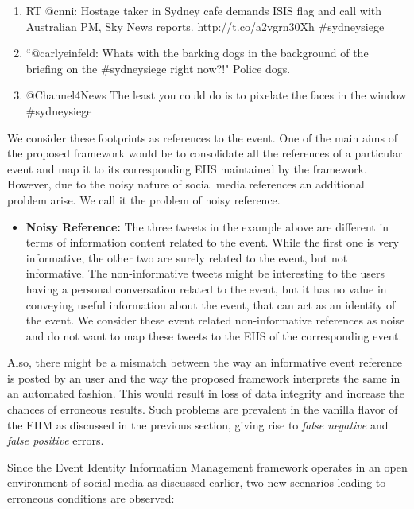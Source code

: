 \begin{enumerate}
\item RT @cnni: Hostage taker in Sydney cafe demands ISIS flag and call with Australian PM, Sky News reports. http://t.co/a2vgrn30Xh \#sydneysiege
\item ``@carlyeinfeld: Whats with the barking dogs in the background of the briefing on the \#sydneysiege right now?!" Police dogs.
\item @Channel4News The least you could do is to pixelate the faces in the window \#sydneysiege
\end{enumerate}

We consider these footprints as references to the event. One of the main aims of the proposed framework would be to consolidate all the references of a particular event and map it to its corresponding EIIS maintained by the framework. However, due to the noisy nature of social media references an additional problem arise. We call it the problem of noisy reference.

\begin{itemize}
\item \textbf{Noisy Reference:} The three tweets in the example above are different in terms of information content related to the event. While the first one is very informative, the other two are surely related to the event, but not informative. The non-informative tweets might be interesting to the users having a personal conversation related to the event, but it has no value in conveying useful information about the event, that can act as an identity of the event. We consider these event related non-informative references as noise and do not want to map these tweets to the EIIS of the corresponding event. 
\end{itemize}

Also, there might be a mismatch between the way an informative event reference is posted by an user and the way the proposed framework interprets the same in an automated fashion. This would result in loss of data integrity and increase the chances of erroneous results. Such problems are prevalent in the vanilla flavor of the EIIM as discussed in the previous section, giving rise to \textit{false negative} and \textit{false positive} errors. 


Since the Event Identity Information Management framework operates in an open environment of social media as discussed earlier, two new scenarios leading to erroneous conditions are observed:

